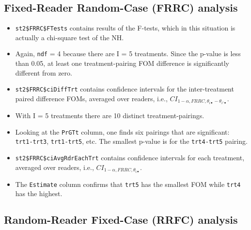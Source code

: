 \documentclass[
]{book}
\begin{document}
\hypertarget{or-applications-FRRC-dataset04}{%
\subsection{Fixed-Reader Random-Case (FRRC) analysis}\label{or-applications-FRRC-dataset04}}

\begin{itemize}
\item
  \texttt{st2\$FRRC\$FTests} contains results of the F-tests, which in this situation is actually a chi-square test of the NH.
\item
  Again, \texttt{ndf} = 4 because there are I = 5 treatments. Since the p-value is less than 0.05, at least one treatment-pairing FOM difference is significantly different from zero.
\item
  \texttt{st2\$FRRC\$ciDiffTrt} contains confidence intervals for the inter-treatment paired difference FOMs, averaged over readers, i.e., \(CI_{1-\alpha,FRRC,\theta_{i \bullet} - \theta_{i' \bullet}}\).
\item
  With I = 5 treatments there are 10 distinct treatment-pairings.
\item
  Looking at the \texttt{PrGTt} column, one finds six pairings that are significant: \texttt{trt1-trt3}, \texttt{trt1-trt5}, etc. The smallest p-value is for the \texttt{trt4-trt5} pairing.
\item
  \texttt{st2\$FRRC\$ciAvgRdrEachTrt} contains confidence intervals for each treatment, averaged over readers, i.e., \(CI_{1-\alpha,FRRC,\theta_{i \bullet}}\).
\item
  The \texttt{Estimate} column confirms that \texttt{trt5} has the smallest FOM while \texttt{trt4} has the highest.
\end{itemize}

\hypertarget{or-applications-RRFC-dataset04}{%
\subsection{Random-Reader Fixed-Case (RRFC) analysis}\label{or-applications-RRFC-dataset04}}
\end{document}
